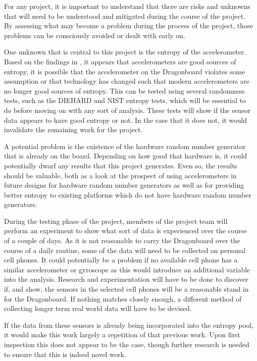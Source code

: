 

For any project, it is important to understand that there are risks and unknowns
that will need to be understood and mitigated during the course of the project.
By assessing what may become a problem during the process of the project, those
problems can be consciously avoided or dealt with early on.

One unknown that is central to this project is the entropy of the accelerometer.
Based on the findings in \cite{voris}, it appears that accelerometers are good
sources of entropy, it is possible that the accelerometer on the Dragonboard
violates some assumption or that technology has changed such that modern
accelerometers are no longer good sources of entropy. This can be tested using
several randomness tests, such as the DIEHARD and NIST entropy tests, which will
be essential to do before moving on with any sort of analysis.  These tests will
show if the sensor data appears to have good entropy or not.  In the case that
it does not, it would invalidate the remaining work for the project. 

A potential problem is the existence of the hardware random number generator
that is already on the board. Depending on how good that hardware is, it could
potentially dwarf any results that this project generates. Even so, the results
should be valuable, both as a look at the prospect of using accelerometers in
future designs for hardware random number generators as well as for providing
better entropy to existing platforms which do not have hardware random number
generators. 

During the testing phase of the project, members of the project team will
perform an experiment to show what sort of data is experienced over the course
of a couple of days. As it is not reasonable to carry the Dragonboard over the
course of a daily routine, some of the data will need to be collected on
personal cell phones. It could potentially be a problem if no available cell
phone has a similar accelerometer or gyroscope as this would introduce an
additional variable into the analysis. Research and experimentation will have to
be done to discover if, and show, the sensors in the selected cell phones will
be a reasonable stand in for the Dragonboard. If nothing matches closely enough,
a different method of collecting longer term real world data will have to be
devised.

If the data from these sensors is already being incorporated into the entropy
pool, it would make this work largely a repetition of that previous work. Upon
first inspection this does not appear to be the case, though further research is
needed to ensure that this is indeed novel work.
